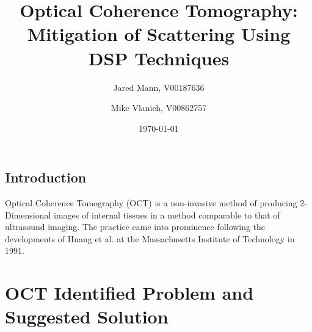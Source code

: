 \documentclass[%
reprint,
showpacs,preprintnumbers,
bibnotes,
amsmath,amssymb,
aps,
pra,
]{revtex4-1}
\begin{document}

	\title{Optical Coherence Tomography: \\ Mitigation of Scattering Using DSP Techniques}

	\author{Jared Mann, V00187636}
	\author{Mike Vlanich, V00862757}

	\date{\today}%


	\begin{abstract}

	\end{abstract}

	\maketitle
	\tableofcontents

	\makeatletter
	\let\toc@pre\relax
	\let\toc@post\relax
	\makeatother

	\listoffigures
	\listoftables

	\subsection{\label{sec:level1}		Introduction}
	Optical Coherence Tomography (OCT) is a non-invasive method of producing 2-Dimensional images of internal tissues in a method comparable to that of ultrasound imaging.\cite{Huang91}\cite{sander_optical_2011} The practice came into prominence following the developments of Huang et al. at the Massachusetts Institute of Technology in 1991. \cite{Huang91}




	\section{\label{sec:level1}OCT Identified Problem and Suggested Solution}
\end{document}
